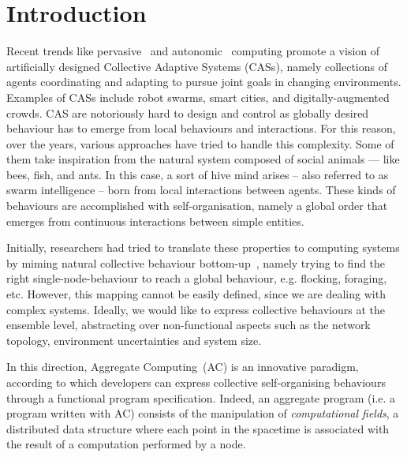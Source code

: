 \documentclass[conference]{IEEEtran}
\begin{document}
\section{Introduction}
Recent trends like pervasive~\cite{DBLP:journals/wc/Satyanarayanan01} and autonomic~\cite{DBLP:journals/computer/KephartC03} computing 
 promote a vision of artificially designed Collective Adaptive Systems (CASs),
 namely collections of agents coordinating and adapting %
 to pursue joint goals in changing environments.
 Examples of CASs include robot swarms, smart cities, and digitally-augmented crowds.
%
%
CAS are notoriously hard to design and control 
 as globally desired behaviour
 has to emerge from local behaviours and interactions. 
For this reason, over the years, various approaches have tried to handle this complexity. Some of them take inspiration from the natural system composed of social animals --- like bees, fish, and ants. 
%
In this case, a sort of hive mind arises -- 
 also referred to as swarm intelligence --  
 born from local interactions between agents. 
%
These kinds of behaviours are accomplished with self-organisation, 
 namely a global order that emerges from continuous 
 interactions between simple entities.

Initially, researchers had tried to translate these properties to computing systems by miming natural collective behaviour bottom-up~\cite{DBLP:journals/connection/Webb02}, 
 namely trying to find the right single-node-behaviour 
 to reach a global behaviour, e.g. flocking, foraging, etc.
%
However, this mapping cannot be easily defined, since we are dealing with complex systems.
%
Ideally, we would like to express collective behaviours at the ensemble level,
 abstracting over non-functional aspects such as the network topology, environment uncertainties and 
 system size.

In this direction, Aggregate Computing~\cite{DBLP:journals/computer/BealPV15}(AC) is an innovative paradigm, according to which
 developers can express collective self-organising behaviours through a functional program specification.
%
Indeed, an aggregate program (i.e. a program written with AC) consists of the manipulation of \textit{computational fields}, a distributed
 data structure where each point in the spacetime is associated with the result of a computation
 performed by a node.
%
\end{document}
